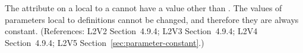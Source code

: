 The  attribute on a \Parameter local to a \KineticLaw cannot
have a value other than .  The values of parameters local to
\KineticLaw definitions cannot be changed, and therefore they are always
constant.  (References: L2V2 Section~4.9.4; L2V3
Section~4.9.4; L2V4 Section~4.9.4; L2V5 Section~\ref{sec:parameter-constant}.)
